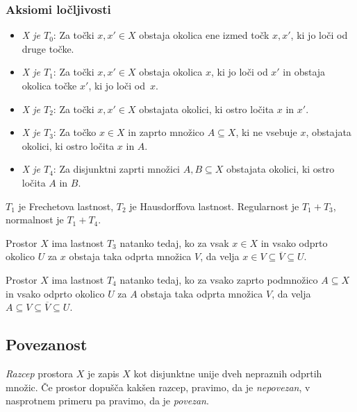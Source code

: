 \subsubsection{Aksiomi ločljivosti}
\begin{itemize}
    \item [] \emph{X je $T_0$}: Za točki $x, x' \in X$ obstaja okolica ene izmed točk $x, x'$, ki jo loči od druge točke.
    \item [] \emph{X je $T_1$}: Za točki $x, x' \in X$ obstaja okolica $x$, ki jo loči od $x'$ in obstaja okolica točke $x'$, ki jo loči od~$x$.
    \item [] \emph{X je $T_2$}: Za točki $x, x' \in X$ obstajata okolici, ki ostro ločita $x$ in $x'$.
    \item [] \emph{X je $T_3$}: Za točko $x \in X$ in zaprto množico $A \subseteq X$, ki ne vsebuje $x$, obstajata okolici, ki ostro ločita $x$ in $A$.
    \item [] \emph{X je $T_4$}: Za disjunktni zaprti množici $A, B \subseteq X$ obstajata okolici, ki ostro ločita $A$ in $B$.
\end{itemize}

\begin{opomba}
    $T_1$ je Frechetova lastnost, $T_2$ je Hausdorffova lastnost. Regularnost je $T_1 + T_3$, normalnost je $T_1 + T_4$.
\end{opomba}

\begin{trditev}
    Prostor $X$ ima lastnost $T_3$ natanko tedaj, ko za vsak $x \in X$ in vsako odprto okolico $U$ za $x$ obstaja taka odprta množica $V$, da velja $x \in V \subseteq \overline{V} \subseteq U$.
\end{trditev}

\begin{trditev}
    Prostor $X$ ima lastnost $T_4$ natanko tedaj, ko za vsako zaprto podmnožico $A \subseteq X$ in vsako odprto okolico $U$ za $A$ obstaja taka odprta množica $V$, da velja $A \subseteq V \subseteq \overline{V} \subseteq U$.
\end{trditev}

\subsection{Povezanost}

\begin{definicija}
    \emph{Razcep} prostora $X$ je zapis $X$ kot disjunktne unije dveh nepraznih odprtih množic. Če prostor dopušča kakšen razcep, pravimo, da je \emph{nepovezan}, v nasprotnem primeru pa pravimo, da je \emph{povezan}.
\end{definicija}

